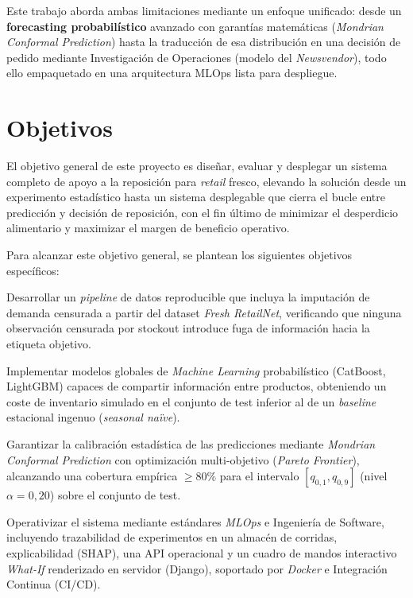 Este trabajo aborda ambas limitaciones mediante un enfoque unificado: desde un \textbf{forecasting probabilístico} avanzado con garantías matemáticas (\textit{Mondrian Conformal Prediction}) hasta la traducción de esa distribución en una decisión de pedido mediante Investigación de Operaciones (modelo del \textit{Newsvendor}), todo ello empaquetado en una arquitectura MLOps lista para despliegue.

\section{Objetivos}
\label{sec:objetivos}
El objetivo general de este proyecto es diseñar, evaluar y desplegar un sistema completo de apoyo a la reposición para \textit{retail} fresco, elevando la solución desde un experimento estadístico hasta un sistema desplegable que cierra el bucle entre predicción y decisión de reposición, con el fin último de minimizar el desperdicio alimentario y maximizar el margen de beneficio operativo.

Para alcanzar este objetivo general, se plantean los siguientes objetivos específicos:
\begin{enumerate}[label=\textbf{O\arabic*.}, ref=O\arabic*]
    \item \label{obj:pipeline} Desarrollar un \textit{pipeline} de datos reproducible que incluya la imputación de demanda censurada a partir del dataset \textit{Fresh RetailNet}, verificando que ninguna observación censurada por stockout introduce fuga de información hacia la etiqueta objetivo.
    \begin{sloppypar}
\item \label{obj:modelos} Implementar modelos globales de \textit{Machine Learning} probabilístico (CatBoost, LightGBM) capaces de compartir información entre productos, obteniendo un coste de inventario simulado en el conjunto de test inferior al de un \textit{baseline} estacional ingenuo (\textit{seasonal naïve}).
    \end{sloppypar}
    \item \label{obj:conformal} Garantizar la calibración estadística de las predicciones mediante \textit{Mondrian Conformal Prediction} con optimización multi-objetivo (\textit{Pareto Frontier}), alcanzando una cobertura empírica $\geq 80\%$ para el intervalo $[q_{0{,}1}, q_{0{,}9}]$ (nivel $\alpha = 0{,}20$) sobre el conjunto de test.
    \item \label{obj:mlops} Operativizar el sistema mediante estándares \textit{MLOps} e Ingeniería de Software,
    incluyendo trazabilidad de experimentos en un almacén de corridas, explicabilidad (SHAP),
    una API operacional y un cuadro de mandos interactivo \textit{What-If} renderizado en servidor
    (Django), soportado por \textit{Docker} e Integración Continua (CI/CD).
\end{enumerate}

